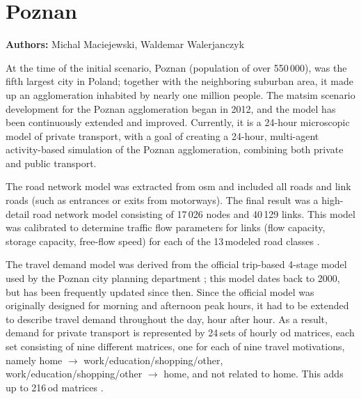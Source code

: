 \chapter{Poznan}
\label{ch:poznan}
\hfill \textbf{Authors:} Michal Maciejewski, Waldemar Walerjanczyk


At the time of the initial scenario, Poznan (population of over 550\,000), was the fifth largest city in Poland; together with the neighboring suburban area, it made up an agglomeration inhabited by nearly one million people. The \gls{matsim} scenario development for the Poznan agglomeration began in 2012, and the model has been continuously extended and improved. Currently, it is a 24-hour microscopic model of private transport, with a goal of creating a 24-hour, multi-agent activity-based simulation of the Poznan agglomeration, combining both private and public transport.

The road network model was extracted from \gls{osm} and included all roads and link roads (such as entrances or exits from motorways). The final result was a high-detail road network model consisting of 17\,026 nodes and 40\,129 links. This model was calibrated to determine traffic flow parameters for links (\eg flow capacity, storage capacity, free-flow speed) for each of the 13\,modeled road classes \citep{PiatkowskiMaciejewski2012osmNetwork}.

The travel demand model was derived from the official trip-based 4-stage model used by the Poznan city planning department ; this model dates back to 2000, but has been frequently updated since then. Since the official model was originally designed for morning and afternoon peak hours, it had to be extended to describe travel demand throughout the day, hour after hour. As a result, demand for private transport is represented by 24\,sets of hourly \gls{od} matrices, each set consisting of nine different matrices, one for each of nine travel motivations, namely home $\rightarrow$ work/education/shopping/other, work/education/shopping/other $\rightarrow$ home, and not related to home. This adds up to 216\,\gls{od} matrices \citep{PiatkowskiEtAl2013Poznan24hSimulation, MaciejewskiEtAl2014MikroMakro}.


